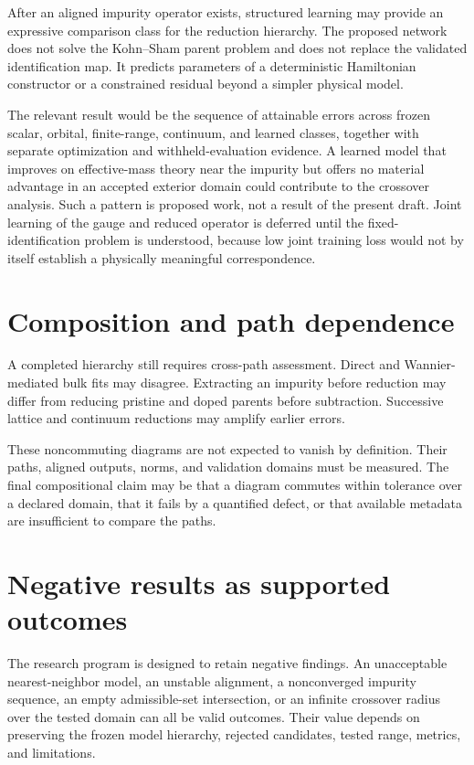 After an aligned impurity operator exists, structured learning may provide an
expressive comparison class for the reduction hierarchy. The proposed network
does not solve the Kohn--Sham parent problem and does not replace the validated
identification map. It predicts parameters of a deterministic Hamiltonian
constructor or a constrained residual beyond a simpler physical model.

The relevant result would be the sequence of attainable errors across frozen
scalar, orbital, finite-range, continuum, and learned classes, together with
separate optimization and withheld-evaluation evidence. A learned model that
improves on effective-mass theory near the impurity but offers no material
advantage in an accepted exterior domain could contribute to the crossover
analysis. Such a pattern is proposed work, not a result of the present draft.
Joint learning of the gauge and reduced operator is deferred until the
fixed-identification problem is understood, because low joint training loss
would not by itself establish a physically meaningful correspondence.

\section{Composition and path dependence}

A completed hierarchy still requires cross-path assessment. Direct and
Wannier-mediated bulk fits may disagree. Extracting an impurity before reduction
may differ from reducing pristine and doped parents before subtraction.
Successive lattice and continuum reductions may amplify earlier errors.

These noncommuting diagrams are not expected to vanish by definition. Their
paths, aligned outputs, norms, and validation domains must be measured. The
final compositional claim may be that a diagram commutes within tolerance over a
declared domain, that it fails by a quantified defect, or that available
metadata are insufficient to compare the paths.

\section{Negative results as supported outcomes}

The research program is designed to retain negative findings. An unacceptable
nearest-neighbor model, an unstable alignment, a nonconverged impurity sequence,
an empty admissible-set intersection, or an infinite crossover radius over the
tested domain can all be valid outcomes. Their value depends on preserving the
frozen model hierarchy, rejected candidates, tested range, metrics, and
limitations.

